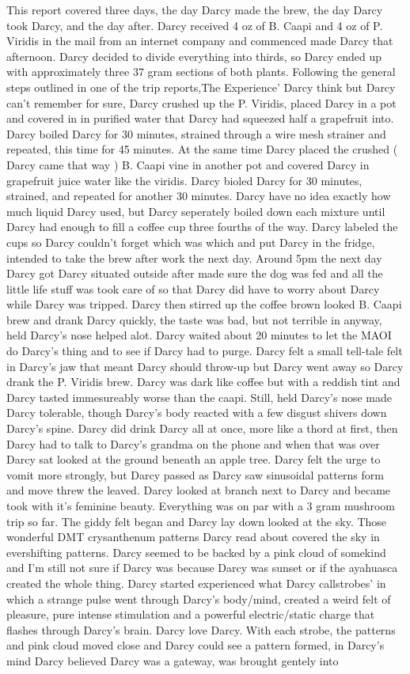 \documentclass[12pt]{book}
\begin{document}
This report covered three days, the day Darcy made the brew, the day Darcy took Darcy, and the day after. Darcy received 4 oz of B. Caapi and 4 oz of P. Viridis in the mail from an internet company and commenced made Darcy that afternoon. Darcy decided to divide everything into thirds, so Darcy ended up with approximately three 37 gram sections of both plants. Following the general steps outlined in one of the trip reports,The Experience' Darcy think but Darcy can't remember for sure, Darcy crushed up the P. Viridis, placed Darcy in a pot and covered in in purified water that Darcy had squeezed half a grapefruit into. Darcy boiled Darcy for 30 minutes, strained through a wire mesh strainer and repeated, this time for 45 minutes. At the same time Darcy placed the crushed ( Darcy came that way ) B. Caapi vine in another pot and covered Darcy in grapefruit juice water like the viridis. Darcy bioled Darcy for 30 minutes, strained, and repeated for another 30 minutes. Darcy have no idea exactly how much liquid Darcy used, but Darcy seperately boiled down each mixture until Darcy had enough to fill a coffee cup three fourths of the way. Darcy labeled the cups so Darcy couldn't forget which was which and put Darcy in the fridge, intended to take the brew after work the next day. Around 5pm the next day Darcy got Darcy situated outside after made sure the dog was fed and all the little life stuff was took care of so that Darcy did have to worry about Darcy while Darcy was tripped. Darcy then stirred up the coffee brown looked B. Caapi brew and drank Darcy quickly, the taste was bad, but not terrible in anyway, held Darcy's nose helped alot. Darcy waited about 20 minutes to let the MAOI do Darcy's thing and to see if Darcy had to purge. Darcy felt a small tell-tale felt in Darcy's jaw that meant Darcy should throw-up but Darcy went away so Darcy drank the P. Viridis brew. Darcy was dark like coffee but with a reddish tint and Darcy tasted immesureably worse than the caapi. Still, held Darcy's nose made Darcy tolerable, though Darcy's body reacted with a few disgust shivers down Darcy's spine. Darcy did drink Darcy all at once, more like a thord at first, then Darcy had to talk to Darcy's grandma on the phone and when that was over Darcy sat looked at the ground beneath an apple tree. Darcy felt the urge to vomit more strongly, but Darcy passed as Darcy saw sinusoidal patterns form and move threw the leaved. Darcy looked at branch next to Darcy and became took with it's feminine beauty. Everything was on par with a 3 gram mushroom trip so far. The giddy felt began and Darcy lay down looked at the sky. Those wonderful DMT crysanthenum patterns Darcy read about covered the sky in evershifting patterns. Darcy seemed to be backed by a pink cloud of somekind and I'm still not sure if Darcy was because Darcy was sunset or if the ayahuasca created the whole thing. Darcy started experienced what Darcy callstrobes' in which a strange pulse went through Darcy's body/mind, created a weird felt of pleasure, pure intense stimulation and a powerful electric/static charge that flashes through Darcy's brain. Darcy love Darcy. With each strobe, the patterns and pink cloud moved close and Darcy could see a pattern formed, in Darcy's mind Darcy believed Darcy was a gateway, was brought gentely into 
\end{document}
